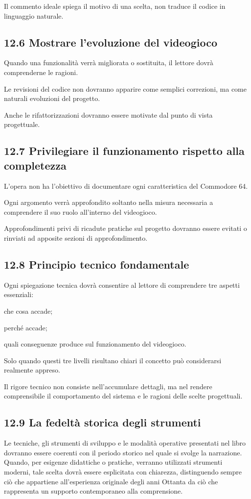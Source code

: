 \documentclass{article}
\begin{document}
Il commento ideale spiega il motivo di una scelta, non traduce il codice in linguaggio naturale.

\subsection[12.6 Mostrare l{}'evoluzione del videogioco]{12.6 Mostrare l'evoluzione del videogioco}
Quando una funzionalità verrà migliorata o sostituita, il lettore dovrà comprenderne le ragioni.

Le revisioni del codice non dovranno apparire come semplici correzioni, ma come naturali evoluzioni del progetto.

Anche le rifattorizzazioni dovranno essere motivate dal punto di vista progettuale.

\subsection{12.7 Privilegiare il funzionamento rispetto alla completezza}
L'opera non ha l'obiettivo di documentare ogni caratteristica del Commodore 64.

Ogni argomento verrà approfondito soltanto nella misura necessaria a comprendere il suo ruolo all'interno del
videogioco.

Approfondimenti privi di ricadute pratiche sul progetto dovranno essere evitati o rinviati ad apposite sezioni di
approfondimento.

\subsection{12.8 Principio tecnico fondamentale}
Ogni spiegazione tecnica dovrà consentire al lettore di comprendere tre aspetti essenziali:

che cosa accade;

perché accade;

quali conseguenze produce sul funzionamento del videogioco.

Solo quando questi tre livelli risultano chiari il concetto può considerarsi realmente appreso.

Il rigore tecnico non consiste nell'accumulare dettagli, ma nel rendere comprensibile il comportamento del sistema e le
ragioni delle scelte progettuali.

\subsection{12.9 La fedeltà storica degli strumenti}
Le tecniche, gli strumenti di sviluppo e le modalità operative presentati nel libro dovranno essere coerenti con il
periodo storico nel quale si svolge la narrazione. Quando, per esigenze didattiche o pratiche, verranno utilizzati
strumenti moderni, tale scelta dovrà essere esplicitata con chiarezza, distinguendo sempre ciò che appartiene
all'esperienza originale degli anni Ottanta da ciò che rappresenta un supporto contemporaneo alla comprensione.
\end{document}
